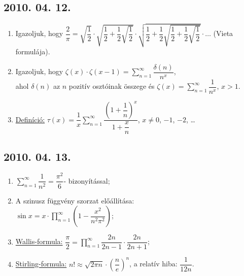 \subsection*{2010. 04. 12.}
\begin{enumerate}
\item Igazoljuk, hogy  $\dfrac{2}{\pi}=\sqrt{\dfrac{1}{2}}\cdot\sqrt{\dfrac{1}{2}+\dfrac{1}{2}\sqrt{\dfrac{1}{2}}}\cdot\sqrt{\dfrac{1}{2}+\dfrac{1}{2}\sqrt{\dfrac{1}{2}+\dfrac{1}{2}\sqrt{\dfrac{1}{2}}}}\cdot\ldots$ (Vieta formulája).
\item Igazoljuk, hogy $\zeta(x)\cdot\zeta(x-1)=\displaystyle\sum_{n=1}^{\infty}\dfrac{\delta(n)}{n^x}$,\\ ahol $\delta(n)$ az $n$ pozitív osztóinak összege és $\zeta(x)=\displaystyle\sum_{n=1}^{\infty}\dfrac{1}{n^x}$, $x>1$.
\item \underline{Definíció:} $\tau(x)=\dfrac{1}{x}\displaystyle\sum_{n=1}^{\infty}\dfrac{\left(1+\dfrac{1}{n}\right)^x}{1+\dfrac{x}{n}}$, $x\not =0$, $-1$, $-2$, \ldots

\end{enumerate}

\subsection*{2010. 04. 13.}
\begin{enumerate}
\item $\displaystyle\sum_{n=1}^{\infty} \dfrac{1}{n^2}=\dfrac{\pi^2}{6}$- bizonyítással;
\item A szinusz függvény szorzat előállítása:\\
$\sin x=x\cdot\displaystyle\prod_{n=1}^{\infty} \left(1-\dfrac{x^2}{n^2\pi^2}\right)$;
\item \underline{Wallis-formula:} $\dfrac{\pi}{2}=\displaystyle\prod_{n=1}^{\infty} \dfrac{2n}{2n-1}\cdot\dfrac{2n}{2n+1}$;
\item \underline{Stirling-formula:} $n!\approx\sqrt{2\pi n}\cdot\left(\dfrac{n}{e}\right)^n$, a relatív hiba: $\dfrac{1}{12n}$.

\end{enumerate}


